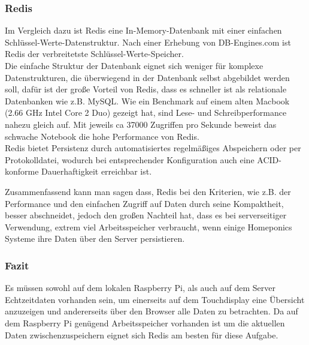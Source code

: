 \subsubsection{Redis}
Im Vergleich dazu ist Redis eine In-Memory-Datenbank mit einer einfachen Schl\"ussel-Werte-Datenstruktur. Nach einer Erhebung von DB-Engines.com ist Redis der verbreitetste Schl\"ussel-Werte-Speicher. \cite{db-engines}\\
Die einfache Struktur der Datenbank eignet sich weniger f\"ur komplexe Datenstrukturen, die \"uberwiegend in der Datenbank selbst abgebildet werden soll, daf\"ur ist der gro{\ss}e Vorteil von Redis, dass es schneller ist als relationale Datenbanken wie z.B. \gls{MySQL}. Wie ein Benchmark auf einem alten Macbook (2.66 GHz Intel Core 2 Duo) gezeigt hat, sind Lese- und Schreibperformance nahezu gleich auf.  Mit jeweils ca 37000 Zugriffen pro Sekunde beweist das schwache Notebook die hohe Performance von Redis. \cite{redisBenchmark}\\
Redis bietet Persistenz durch automatisiertes regelm\"a{\ss}iges Abspeichern oder per Protokolldatei, wodurch bei entsprechender Konfiguration auch eine \gls{ACID}-konforme Dauerhaftigkeit erreichbar ist. \cite{Redis_Evaluation}

Zusammenfassend kann man sagen dass, Redis bei den Kriterien, wie z.B. der Performance und den einfachen Zugriff auf Daten durch
seine Kompaktheit, besser abschneidet, jedoch den gro{\ss}en Nachteil hat, dass es bei serverseitiger Verwendung, extrem viel Arbeitsspeicher verbraucht, wenn einige Homeponics Systeme ihre Daten \"uber den Server persistieren.

\subsubsection{Fazit}
Es m\"ussen sowohl auf dem lokalen Raspberry Pi, als auch auf dem Server Echtzeitdaten vorhanden sein, um einerseits auf dem Touchdisplay eine \"Ubersicht anzuzeigen und andererseits \"uber den Browser alle Daten zu betrachten. Da auf dem Raspberry Pi genügend Arbeitsspeicher vorhanden ist um die aktuellen Daten zwischenzuspeichern eignet sich Redis am besten für diese Aufgabe.
\newpage

